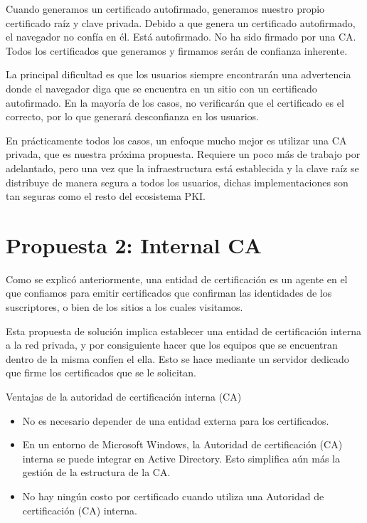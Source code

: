Cuando generamos un certificado autofirmado, generamos nuestro propio certificado 
raíz y clave privada. Debido a que genera un certificado autofirmado, el navegador 
no confía en él. Está autofirmado. No ha sido firmado por una CA. Todos los 
certificados que generamos y firmamos serán de confianza inherente.

La principal dificultad es que los usuarios siempre encontrarán una advertencia 
donde el navegador diga que se encuentra en un sitio con un certificado autofirmado. 
En la mayoría de los casos, no verificarán que el certificado es el correcto, por 
lo que generará desconfianza en los usuarios.

En prácticamente todos los casos, un enfoque mucho mejor es utilizar una CA privada, 
que es nuestra próxima propuesta. Requiere un poco más de trabajo por adelantado, 
pero una vez que la infraestructura está establecida y la clave raíz se distribuye 
de manera segura a todos los usuarios, dichas implementaciones son tan seguras como 
el resto del ecosistema PKI.

\section{Propuesta 2: Internal CA}

Como se explicó anteriormente, una entidad de certificación es un agente en el que 
confiamos para emitir 
certificados que confirman las identidades de los suscriptores, o bien de los 
sitios a los cuales visitamos. 

Esta propuesta de solución implica establecer una entidad de certificación interna 
a la red privada, y por consiguiente hacer que los equipos que se encuentran 
dentro de la misma confíen el ella. Esto se hace 
mediante un servidor dedicado que firme los certificados que se le solicitan.

Ventajas de la autoridad de certificación interna (CA)
\begin{itemize}
   \setlength\itemsep{-0.6em}
   \item No es necesario depender de una entidad externa para los certificados.
   \item En un entorno de Microsoft Windows, la Autoridad de certificación (CA) interna se puede 
   integrar en Active Directory. Esto simplifica aún más la gestión de la estructura de la CA.
   \item No hay ningún costo por certificado cuando utiliza una Autoridad de certificación (CA) 
   interna.
\end{itemize}

